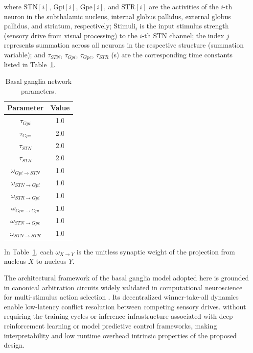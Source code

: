 where $\text{STN}[i]$, $\text{Gpi}[i]$, $\text{Gpe}[i]$, and $\text{STR}[i]$ are the activities of the $i$-th neuron in the subthalamic nucleus, internal globus pallidus, external globus pallidus, and striatum, respectively; $\text{Stimuli}_i$ is the input stimulus strength (sensory drive from visual processing) to the $i$-th STN channel; the index $j$ represents summation across all neurons in the respective structure (summation variable); and $\tau_{STN}$, $\tau_{Gpi}$, $\tau_{Gpe}$, $\tau_{STR}$ (s) are the corresponding time constants listed in Table~\ref{table:Ganglia}.

\begin{table}[t]
\centering
\caption{Basal ganglia network parameters.}
\begin{tabular}{|c|c|}
\hline
\textbf{Parameter} & \textbf{Value} \\ \hline
$\tau_{Gpi}$ & 1.0 \\ \hline
$\tau_{Gpe}$ & 2.0 \\ \hline
$\tau_{STN}$ & 2.0 \\ \hline
$\tau_{STR}$ & 2.0 \\ \hline
$\omega_{Gpi\rightarrow STN}$ & 1.0 \\ \hline
$\omega_{STN\rightarrow Gpi}$ & 1.0 \\ \hline
$\omega_{STR\rightarrow Gpi}$ & 1.0 \\ \hline
$\omega_{Gpe\rightarrow Gpi}$ & 1.0 \\ \hline
$\omega_{STN\rightarrow Gpe}$ & 1.0 \\ \hline
$\omega_{STN\rightarrow STR}$ & 1.0 \\ \hline
\end{tabular}
\label{table:Ganglia}
\end{table}

In Table~\ref{table:Ganglia},  each $\omega_{X\rightarrow Y}$ is the unitless synaptic weight of the projection from nucleus $X$ to nucleus $Y$.

The architectural framework of the basal ganglia model adopted here is grounded in canonical arbitration circuits widely validated in computational neuroscience for multi-stimulus action selection \citep{Gurney2001a,Gurney2001b,Prescott2006Robot}. Its decentralized winner-take-all dynamics enable low-latency conflict resolution between competing sensory drives.  without requiring the training cycles or inference infrastructure associated with deep reinforcement learning or model predictive control frameworks, making interpretability and low runtime overhead intrinsic properties of the proposed design.

